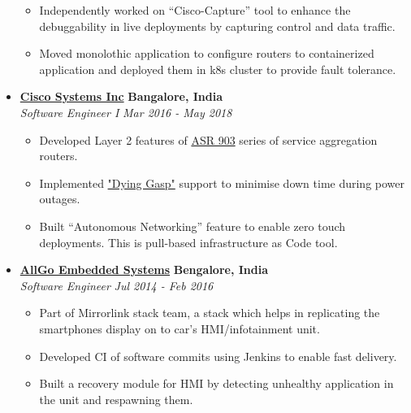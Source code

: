 \documentclass[10pt,letterpaper]{article}
\begin{document}
\begin{itemize}
    \begin{itemize}[label=\textbullet]
      \itemsep0em
      \item Independently worked on “Cisco-Capture” tool to enhance the debuggability in live 
      deployments by capturing control and data traffic.
      \item Moved monolothic application to configure routers to containerized
      application and deployed them in k8s cluster to provide fault tolerance.
    \end{itemize}


    \item[]
    {\href{http://www.cisco.com}{\textbf{Cisco Systems Inc}} \hfill
      \textbf{Bangalore, India}}
    \\
    {\emph{Software Engineer I} \hfill \emph{Mar 2016 - May 2018}}

    \begin{itemize}[label=\textbullet]
      \itemsep0em
      \item Developed Layer 2 features of \href{https://www.cisco.com/c/en/us/support/routers/asr-903-router/model.html}{ASR 903} series
      of service aggregation routers.
      \item Implemented \href{https://www.cisco.com/c/en/us/td/docs/routers/asr903/software/guide/chassis/xe
      3s/b_Config_Guide_fullbook/b-cfg-dyg-gasp.html}{"Dying Gasp"} support to minimise down time during power outages.
      \item Built “Autonomous Networking” feature to enable zero touch deployments. This is pull-based infrastructure as Code tool.
    \end{itemize}

    \item[]
    {\href{https://www.allgosystems.com/}{\textbf{AllGo Embedded Systems}} \hfill
      \textbf{Bengalore, India}}
    \\
    {\emph{Software Engineer} \hfill \emph{Jul 2014 - Feb 2016}}

    \begin{itemize}[label=\textbullet]
      \itemsep0em
      \item Part of Mirrorlink stack team, a stack which helps in replicating the
smartphones display on to car’s HMI/infotainment unit.
      \item Developed CI of software commits using Jenkins to enable fast delivery. 
      \item Built a recovery module for HMI by detecting unhealthy application in the unit and respawning them.
    \end{itemize}

  \end{itemize}
\end{document}
